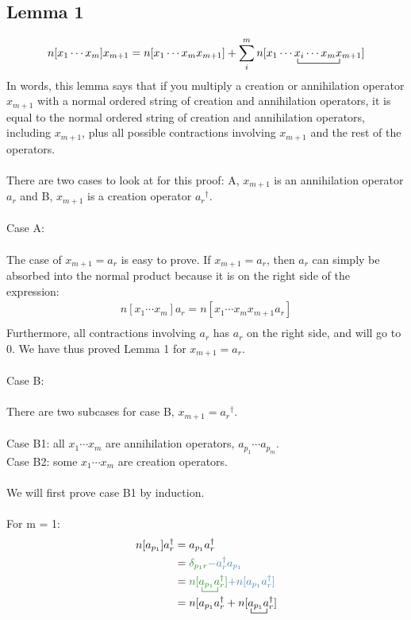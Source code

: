\documentclass{article}
\newcommand{\ctr}{\bcontraction}
\newcommand{\dg}{\ensuremath{^\dagger} }
\newcommand{\cd}{\ensuremath{\cdots} }
\def\cb#1{{\color{blue}#1}}
\def\cg#1{{\color{green}#1}}
\begin{document}
\subsection{Lemma 1}
\[n[x_1 \cd x_m]x_{m+1} = n[x_1 \cd x_m x_{m+1}] + \sum_i^m n[\ctr{x_1 \cd}{x}{{}_i \cd x_m}{x} x_1 \cd x_i \cd x_m x_{m+1}]\]
In words, this lemma says that if you multiply a creation or annihilation operator $x_{m+1}$ with a normal ordered string of creation and annihilation operators,
it is equal to the normal ordered string of creation and annihilation operators, including $x_{m+1}$,
plus all possible contractions involving $x_{m+1}$ and the rest of the operators. 
\\ \\
There are two cases to look at for this proof: 
A,  $x_{m+1}$ is an annihilation operator $a_r$ and 
B,  $x_{m+1}$ is a creation operator $a_r\dg$. 
\\ \\
Case A: 
\\ \\
The case of  $x_{m+1} = a_r$ is easy to prove. 
If $x_{m+1} = a_r$, then $a_r$ can simply be absorbed into the normal product because it is on the right side of the expression: 
\begin{align*}
n[x_1 \cd x_m]a_r = n[x_1 \cd x_m x_{m+1}a_r] \\
\end{align*}
Furthermore, all contractions involving $a_r$ has $a_r$ on the right side, and will go to 0. 
We have thus proved Lemma 1 for $x_{m+1} = a_r$. 
\\ \\
Case B: 
\\ \\
There are two subcases for case B, $x_{m+1} = a_r\dg$. \\ \\
Case B1: all $x_1 \cd x_m$ are annihilation operators, $a_{p_1} \cd a_{p_m}$. \\
Case B2: some $x_1 \cd x_m$ are creation operators.
\\ \\
We will first prove case B1 by induction. \\ \\
For m = 1: 
\begin{align*}
n[a_{p_1}]a_r\dg &= a_{p_1}a_r\dg\\
&= \cg{\delta_{p_1r} } \cb{-  a_r\dg a_{p_1}} \\
  &=  \cg{n[ \ctr{}{a}{{}_{p_1}}{a} a_{p_1}a_r\dg]} \cb{+ n[a_{p_1}a_r\dg] } \\
  &= n[a_{p_1}a_r\dg + n[ \ctr{}{a}{{}_{p_1}}{a} a_{p_1}a_r\dg]
\end{align*} 
\end{document}
